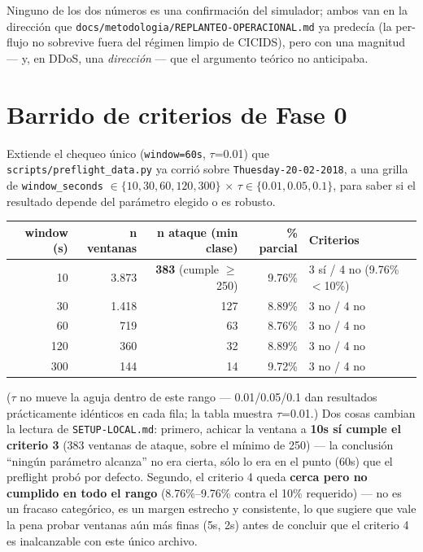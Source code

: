 \documentclass[11pt]{article}
\newcommand{\code}[1]{\texttt{\small #1}}
\begin{document}
Ninguno de los dos números es una confirmación del simulador; ambos van en la dirección
que \code{docs/metodologia/REPLANTEO-OPERACIONAL.md} ya predecía (la per-flujo no
sobrevive fuera del régimen limpio de CICIDS), pero con una magnitud --- y, en DDoS, una
\emph{dirección} --- que el argumento teórico no anticipaba.

\section{Barrido de criterios de Fase 0}
\label{sec:phase0}

Extiende el chequeo único (\code{window=60s}, $\tau$=0.01) que \code{scripts/preflight\_data.py}
ya corrió sobre \code{Thuesday-20-02-2018}, a una grilla de \code{window\_seconds}
$\in \{10,30,60,120,300\}$ $\times$ $\tau \in \{0.01, 0.05, 0.1\}$, para saber si el
resultado depende del parámetro elegido o es robusto.

\begin{center}
\begin{tabular}{@{}rrrrl@{}}
\toprule
\textbf{window (s)} & \textbf{n ventanas} & \textbf{n ataque (min clase)} & \textbf{\% parcial} & \textbf{Criterios} \\
\midrule
10  & 3.873 & \textbf{383} (cumple $\geq$250) & 9.76\% & 3 sí / 4 no (9.76\%$<$10\%) \\
30  & 1.418 & 127 & 8.89\% & 3 no / 4 no \\
60  & 719   & 63  & 8.76\% & 3 no / 4 no \\
120 & 360   & 32  & 8.89\% & 3 no / 4 no \\
300 & 144   & 14  & 9.72\% & 3 no / 4 no \\
\bottomrule
\end{tabular}
\end{center}

($\tau$ no mueve la aguja dentro de este rango --- 0.01/0.05/0.1 dan resultados
prácticamente idénticos en cada fila; la tabla muestra $\tau$=0.01.) Dos cosas cambian la
lectura de \code{SETUP-LOCAL.md}: primero, achicar la ventana a \textbf{10s sí cumple el
criterio 3} (383 ventanas de ataque, sobre el mínimo de 250) --- la conclusión ``ningún
parámetro alcanza'' no era cierta, sólo lo era en el punto (60s) que el preflight probó
por defecto. Segundo, el criterio 4 queda \textbf{cerca pero no cumplido en todo el
rango} (8.76\%--9.76\% contra el 10\% requerido) --- no es un fracaso categórico, es un
margen estrecho y consistente, lo que sugiere que vale la pena probar ventanas aún más
finas (5s, 2s) antes de concluir que el criterio 4 es inalcanzable con este único
archivo.
\end{document}
